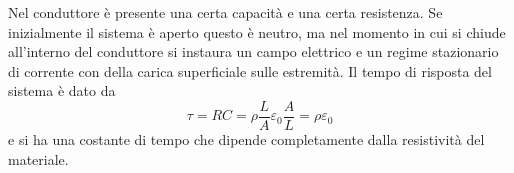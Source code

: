 Nel conduttore \`e presente una certa capacit\`a e una certa resistenza. Se inizialmente il sistema \`e aperto questo \`e neutro, ma nel momento in cui si chiude all'interno del conduttore si instaura un campo elettrico e un regime stazionario di corrente con della carica superficiale sulle estremit\`a.  Il tempo di risposta del sistema \`e dato da 
\begin{equation*}
	\tau = RC = \rho \frac{L}{A}\varepsilon_0\frac{A}{L} = \rho \varepsilon_0
\end{equation*}  
e si ha una costante di tempo che dipende completamente dalla resistivit\`a del materiale.



